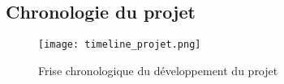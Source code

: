 \subsection{Chronologie du projet}
\begin{figure}[hbt!]
    \centering
    \texttt{[image: timeline\_projet.png]}
    \caption{Frise chronologique du développement du projet}

\end{figure}
